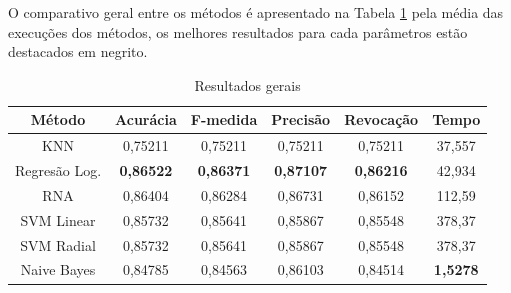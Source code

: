 O comparativo geral entre os métodos é apresentado na Tabela \ref{table:resultadosGerais} pela média das execuções dos métodos, os melhores resultados para cada parâmetros estão destacados em negrito.

\begin{table}[h]
\centering
\caption{Resultados gerais}
\vspace{0.2cm}
\begin{tabular}{c|c|c|c|c|c}
Método & Acurácia & F-medida & Precisão & Revocação & Tempo \\
\hline
KNN                & 0,75211 & 0,75211 & 0,75211 & 0,75211 & 37,557 \\
Regresão Log. & \textbf{0,86522} & \textbf{0,86371} & \textbf{0,87107} & \textbf{0,86216} & 42,934 \\
RNA                & 0,86404 & 0,86284 & 0,86731 & 0,86152 & 112,59 \\
SVM Linear         & 0,85732 & 0,85641 & 0,85867 & 0,85548 & 378,37 \\
SVM Radial         & 0,85732 & 0,85641 & 0,85867 & 0,85548 & 378,37 \\
Naive Bayes        & 0,84785 & 0,84563 & 0,86103 & 0,84514 & \textbf{1,5278} \\
\end{tabular}
\label{table:resultadosGerais}
\end{table}


